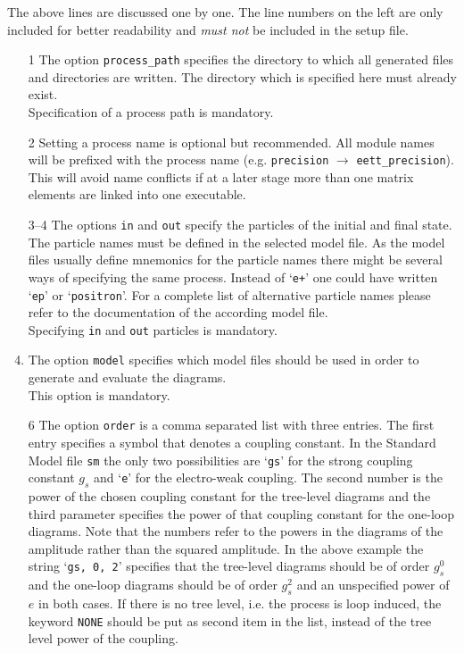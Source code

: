 \documentclass[11pt,a4paper]{refrep}
\begin{document}
The above lines are discussed one by one. The line numbers on the left
are only included for better readability and \emph{must not} be included
in the setup file.
\begin{enumerate}
\item[1] The option \texttt{process\_path} specifies the directory
to which all generated files and directories are written.
The directory which is specified here must already exist.
\\Specification of a process path is mandatory.
\item[2] Setting a process name is optional but recommended. All module
names will be prefixed with the  process name (e.g. \texttt{precision}
$\to$ \texttt{eett\_precision}). This will avoid name conflicts if at
a later stage more than one matrix elements are linked into one
executable.
\item[3--4] The options \texttt{in} and \texttt{out} specify the particles
of the initial and final state. The particle names must be defined in the
selected model file. As the model files usually define mnemonics for the
particle names there might be several ways of specifying the same process.
Instead of `\lstinline[basicstyle=\ttfamily]{e+}'
one could have written `\lstinline[basicstyle=\ttfamily]{ep}'
or `\lstinline[basicstyle=\ttfamily]{positron}'.
For a complete list of
alternative particle names please refer to the documentation of the
according model file.
\\Specifying \texttt{in} and \texttt{out} particles is mandatory.
\item[5] The option \texttt{model} specifies which model files should
be used in order to generate and evaluate the diagrams. 
\\This option is mandatory.
\item[6] The option \texttt{order} is a comma separated list with
three entries. The first entry specifies a symbol that denotes a coupling
constant. In the Standard Model file \texttt{sm} the only two possibilities
are `\lstinline[basicstyle=\ttfamily]{gs}' for the strong coupling constant
$g_s$ and `\lstinline[basicstyle=\ttfamily]{e}' for the electro-weak coupling.
The second number is the power of the chosen coupling constant for the
tree-level diagrams and the third parameter specifies the power of that
coupling constant for the one-loop diagrams.
\attention Note that the numbers
refer to the powers in the diagrams of the amplitude
rather than the squared amplitude. In the above example the
string `\lstinline[basicstyle=\ttfamily]{gs, 0, 2}' specifies that
the tree-level diagrams should be of order $g_s^0$ and the one-loop
diagrams should be of order $g_s^2$ and an unspecified
power of $e$ in both cases. 
If there is no tree level, i.e. the process is loop induced, 
the keyword \texttt{NONE} should be put as second item in the list,
instead of the tree level power of the coupling.


\end{enumerate}
\end{document}
